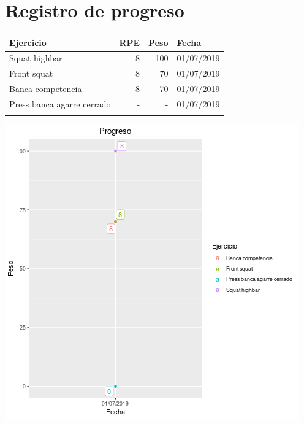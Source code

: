 \documentclass[11pt]{article}
\begin{document}
\section{Registro de progreso}
\label{sec:org8a42672}
\begin{center}
\label{tab:orgf9d342c}
\begin{tabular}{lrrl}
Ejercicio & RPE & Peso & Fecha\\
\hline
Squat highbar & 8 & 100 & 01/07/2019\\
Front squat & 8 & 70 & 01/07/2019\\
Banca competencia & 8 & 70 & 01/07/2019\\
Press banca agarre cerrado & - & - & 01/07/2019\\
 &  &  & \\
\end{tabular}
\end{center}
\begin{center}
\includegraphics[width=.9\linewidth]{tmp.png}
\end{center}
\end{document}
